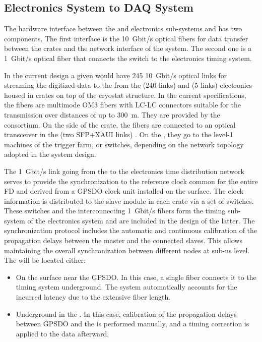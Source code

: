 \subsection{Electronics System to DAQ System}
\label{ssec:dp-tpcelec-intfc-daq}

The hardware interface between the \dual {} and  electronics sub-systems and  has two components. The first interface is the \SI{10}{Gbit/s} optical fibers for data transfer between the  crates and the network interface of the  system. The second one is a \SI{1}{Gbit/s} optical fiber that connects the   switch to the \dual electronics timing system.   

In the current design a given  would have \num{245} \SI{10}{Gbit/s} optical links for streaming the digitized data to the  from the  (\num{240} links) and  (\num{5} links) electronics housed in  crates on top of the cryostat structure.  In the current specifications, the fibers are multimode OM3 fibers \cite{om3fibers} with LC-LC connectors suitable for the transmission over distances of up to \SI{300}{\metre}.  They are provided by the  consortium. On the side of the  crate, the fibers are connected to an optical transceiver in the  (two SFP+XAUI links) \cite{natmch}.  On the , they go to the level-1 machines of the trigger farm, or switches, depending on the network topology adopted in the  system design.

The \SI{1}{Gbit/s} link going from the  to the \dual electronics time distribution network serves to provide the synchronization to the reference clock common for the entire FD and derived from a GPSDO clock unit installed on the surface. The clock information is distributed to the  slave module in each  crate via a set of  switches. These switches and the interconnecting \SI{1}{Gbit/s} fibers form the timing sub-system of the \dual electronics system and are included in the design of the latter. The  synchronization protocol includes the automatic and continuous calibration of the propagation delays between the master and the connected slaves. This allows maintaining the overall synchronization between different nodes at sub-ns level. The  will be located either:
\begin{itemize}
\item{On the surface near the GPSDO. In this case, a single fiber connects it to the \dual timing system underground. The system automatically accounts for the incurred latency due to the extensive fiber length.}
\item{Underground in the . In this case, calibration of the propagation delays between GPSDO and the  is performed manually, and a timing correction is applied to the data afterward.}
\end{itemize} 

